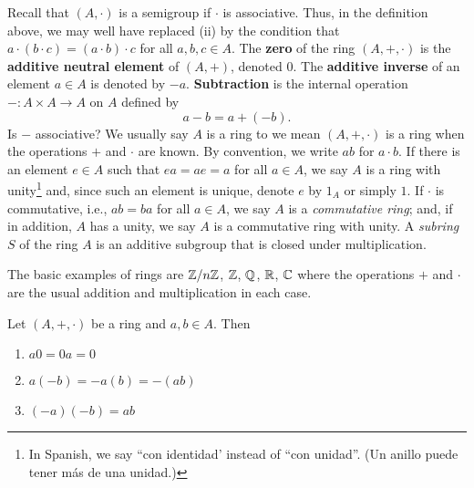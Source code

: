 \documentclass[11pt,a4paper]{article}
\begin{document}
%
Recall that  $(A,\cdot)$ is a semigroup if \(\cdot\) is associative.
Thus, in the definition above, we may well have replaced (ii) by the condition that \(a\cdot(b\cdot c) = (a \cdot b)\cdot c\) for all \(a,b,c\in A\).
The \textbf{zero} of the ring \((A,+,\cdot)\) is the  \textbf{additive neutral element} of $(A,+)$, denoted $0$.
The \textbf{additive inverse} of an element $a\in A$ is denoted by $-a$.
\textbf{Subtraction} is the internal operation \(-\colon A\times A\to A\) on $A$ defined by
\[
a-b = a+(-b).
\]
Is \(-\) associative?
We usually say \(A\) is a ring to we mean \((A,+,\cdot)\) is a ring when the operations \(+\) and \(\cdot\) are known.
By convention, we write $ab$ for  $a\cdot b$.
If there is an element \(e\in A\) such that \(e  a = a  e = a\) for all \(a\in A\), we say \(A\) is a ring with unity\footnote{In Spanish, we say ``con identidad' instead of ``con unidad''. (Un anillo puede tener más de una unidad.)}
and, since such an element is unique,  denote  \(e\) by \(1_A\) or simply \(1\). 
If \(\cdot\) is commutative, i.e., \(ab = ba\) for all \(a\in A\), we say \(A\) is a \textit{commutative ring}; and, if in addition, \(A\) has a unity, we say \(A\) is a commutative ring with unity.
A \textit{subring} $S$ of the ring $A$ is an additive subgroup that is closed under multiplication.



%



\begin{exa}
    The basic examples of rings are \(\mathbb{Z}/n\mathbb{Z}\), $\mathbb{Z}$, $\mathbb{Q}$, $\mathbb{R}$, $\mathbb{C}$ where the operations $+$ and $\cdot$ are the usual addition and multiplication in each case.
\end{exa}
 
\begin{teo}
Let $(A,+,\cdot)$ be a ring and
$a,b \in A$. Then 
\begin{enumerate}[label=(\roman*)]
    \item \(a 0 = 0 a = 0\)
    \item \(a (-b) = -a (b) = -(a b)\)
    \item \((-a)(-b) = a b\)
\end{enumerate}
\end{teo} 
\end{document}
